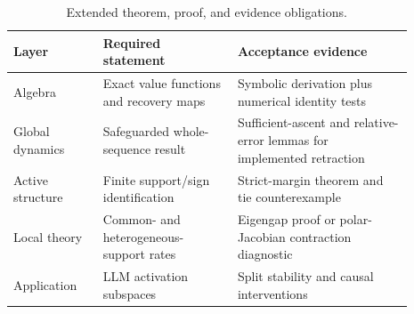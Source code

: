 \begin{table}[t]
\centering
\caption{Extended theorem, proof, and evidence obligations.}
\label{tab:a-extended-obligations}
\small
\begin{tabular}{p{0.20\linewidth}p{0.30\linewidth}p{0.39\linewidth}}
\toprule
Layer & Required statement & Acceptance evidence \\
\midrule
Algebra & Exact value functions and recovery maps & Symbolic derivation plus numerical identity tests \\
Global dynamics & Safeguarded whole-sequence result & Sufficient-ascent and relative-error lemmas for implemented retraction \\
Active structure & Finite support/sign identification & Strict-margin theorem and tie counterexample \\
Local theory & Common- and heterogeneous-support rates & Eigengap proof or polar-Jacobian contraction diagnostic \\
Application & LLM activation subspaces & Split stability and causal interventions \\
\bottomrule
\end{tabular}
\end{table}
